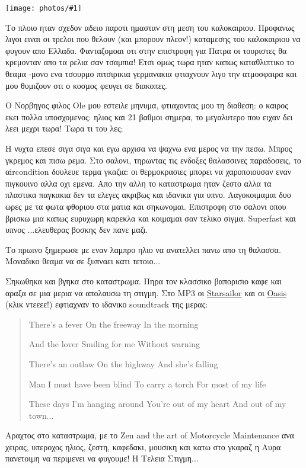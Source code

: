 \documentclass[]{book}
\newcommand\photo[1]{\noindent\texttt{[image: photos/\#1]}}
\begin{document}
\photo{4.jpg}

Tο πλοιο ηταν σχεδον αδειο παροτι ημασταν στη μεση του καλοκαιριου. Προφανως λιγοι ειναι οι τρελοι που θελουν (και μπορουν πλεον!) καταμεσης του καλοκαιριου να φυγουν απο Ελλαδα. Φανταζομοαι οτι στην επιστροφη για Πατρα οι τουριστες θα κρεμονταν απο τα ρελια σαν τσαμπια! Ετσι ομως τωρα ηταν καπως καταθλιπτικο το θεαμα -μονο ενα τσουρμο πιτσιρικια γερμανακια φτιαχνουν λιγο την ατμοσφαιρα και μου θυμιζουν οτι ο κοσμος φευγει σε διακοπες.

Ο Νορβηγος φιλος Ole μου εστειλε μηνυμα, φτιαχοντας μου τη διαθεση: ο καιρος εκει πολλα υποσχομενος: ηλιος και 21 βαθμοι σημερα, το μεγαλυτερο που ειχαν δει λεει μεχρι τωρα! Τωρα τι του λες;

Η νυχτα επεσε σιγα σιγα και εγω αρχισα να ψαχνω ενα μερος να την πεσω. Μπρος γκρεμος και πισω ρεμα. Στο σαλονι, τηρωντας τις ενδοξες θαλασσινες παραδοσεις, το αircondition δουλευε τερμα γκαζια: οι θερμοκρασιες μπορει να χαροποιουσαν εναν πιγκουινο αλλα οχι εμενα. Απο την αλλη το καταστρωμα ηταν ζεστο αλλα τα πλαστικα παγκακια δεν τα ελεγες ακριβως και ιδανικα για υπνο. Λαγοκοιμαμαι δυο ωρες με τα φωτα φθοριου στα ματια και σηκωνομαι. Επιστροφη στο σαλονι οπου βρισκω μια καπως ευρυχωρη καρεκλα και κοιμαμαι σαν τελικο σιγμα. Superfast και υπνος ...ελευθερας βοσκης δεν πανε μαζι. 

Το πρωινο ξημερωσε με εναν λαμπρο ηλιο να ανατελλει πανω απο τη θαλασσα. Μοναδικο θεαμα να σε ξυπναει κατι τετοιο...

Σηκωθηκα και βγηκα στο καταστρωμα. Πηρα τον κλασσικο βαπορισιο καφε και αραξα σε μια μερια να απολαυσω τη στιγμη. Στο MP3 οι \href{http://goo.gl/HcaG4}{Starsailor} και οι \href{http://goo.gl/6sdDG}{Oasis} (κλικ ντεεεε!) εφτιαχναν το ιδανικο soundtrack της μερας:

\begin{verse}
There's a fever
On the freeway
In the morning

And the lover
Smiling for me
Without warning

There's an outlaw
On the highway
And she's falling

Man I must have been blind
To carry a torch
For most of my life

These days I'm hanging around
You're out of my heart
And out of my town...
\end{verse}

Αραχτος στο καταστρωμα, με το Zen and the art of Motorcycle Maintenance ανα χειρας, υπεροχος ηλιος, ζεστη, καφεδακι, μουσικη και κατω στο γκαραζ η Αυρα πανετοιμη να περιμενει να φυγουμε! Η Τελεια Στιγμη...
\end{document}

